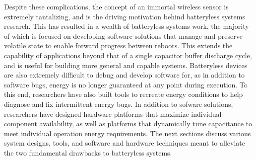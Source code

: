 Despite these complications, the concept of an immortal wireless sensor is extremely tantalizing, and is the driving motivation behind batteryless systems research.
This has resulted in a wealth of batteryless systems work, the majority of which is focused on developing software solutions that manage and preserve volatile state to enable forward progress between reboots. 
This extends the capability of applications beyond that of a single capacitor buffer discharge cycle, and is useful for building more general and capable systems.
Batteryless devices are also extremely difficult to debug and develop software for, as in addition to software bugs, energy is no longer guaranteed at any point during execution.
To this end, researchers have also built tools to recreate energy conditions to help diagnose and fix intermittent energy bugs.
In addition to sofware solutions, researchers have designed hardware platforms that maximize individual component availability, as well as platforms that dynamically tune capacitance to meet individual operation energy requirements.
The next sections discuss various system designs, tools, and software and hardware techniques meant to alleviate the two fundamental drawbacks to batteryless systems. 

